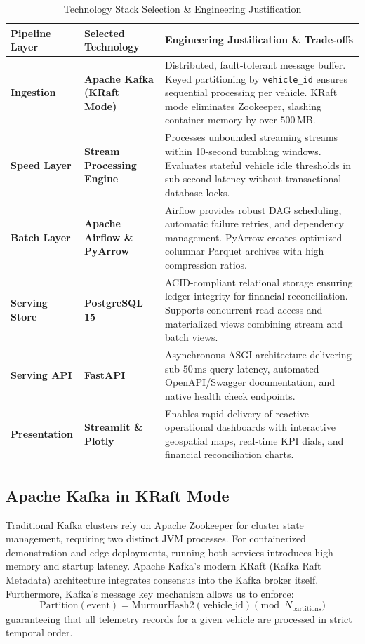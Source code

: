 \documentclass[11pt,a4paper]{article}
\begin{document}
\begin{table}[htbp]
\centering
\footnotesize
\caption{Technology Stack Selection \& Engineering Justification}
\label{tab:tech_stack_justification}
\begin{tabularx}{\textwidth}{l p{3.2cm} X}
\toprule
\textbf{Pipeline Layer} & \textbf{Selected Technology} & \textbf{Engineering Justification \& Trade-offs} \\
\midrule
\textbf{Ingestion} & \textbf{Apache Kafka (KRaft Mode)} & Distributed, fault-tolerant message buffer. Keyed partitioning by \texttt{vehicle\_id} ensures sequential processing per vehicle. KRaft mode eliminates Zookeeper, slashing container memory by over $500\,\text{MB}$. \\
\addlinespace
\textbf{Speed Layer} & \textbf{Stream Processing Engine} & Processes unbounded streaming streams within 10-second tumbling windows. Evaluates stateful vehicle idle thresholds in sub-second latency without transactional database locks. \\
\addlinespace
\textbf{Batch Layer} & \textbf{Apache Airflow \& PyArrow} & Airflow provides robust DAG scheduling, automatic failure retries, and dependency management. PyArrow creates optimized columnar Parquet archives with high compression ratios. \\
\addlinespace
\textbf{Serving Store} & \textbf{PostgreSQL 15} & ACID-compliant relational storage ensuring ledger integrity for financial reconciliation. Supports concurrent read access and materialized views combining stream and batch views. \\
\addlinespace
\textbf{Serving API} & \textbf{FastAPI} & Asynchronous ASGI architecture delivering sub-$50\,\text{ms}$ query latency, automated OpenAPI/Swagger documentation, and native health check endpoints. \\
\addlinespace
\textbf{Presentation} & \textbf{Streamlit \& Plotly} & Enables rapid delivery of reactive operational dashboards with interactive geospatial maps, real-time KPI dials, and financial reconciliation charts. \\
\bottomrule
\end{tabularx}
\end{table}

\subsection{Apache Kafka in KRaft Mode}
Traditional Kafka clusters rely on Apache Zookeeper for cluster state management, requiring two distinct JVM processes. For containerized demonstration and edge deployments, running both services introduces high memory and startup latency. Apache Kafka's modern KRaft (Kafka Raft Metadata) architecture integrates consensus into the Kafka broker itself. Furthermore, Kafka's message key mechanism allows us to enforce:
\begin{equation}
    \text{Partition}(\text{event}) = \text{MurmurHash2}(\text{vehicle\_id}) \pmod{N_{\text{partitions}}}
\end{equation}
guaranteeing that all telemetry records for a given vehicle are processed in strict temporal order.
\end{document}
